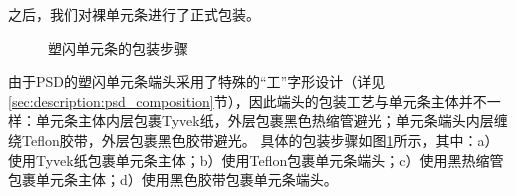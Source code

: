 之后，我们对裸单元条进行了正式包装。
\begin{figure}[htb]
\centering
{}
\caption{塑闪单元条的包装步骤}
\label{fig:construction:bar_wrapping}
\end{figure}
由于PSD的塑闪单元条端头采用了特殊的“工”字形设计（详见\ref{sec:description:psd_composition}节），因此端头的包装工艺与单元条主体并不一样：单元条主体内层包裹Tyvek纸，外层包裹黑色热缩管避光；单元条端头内层缠绕Teflon胶带，外层包裹黑色胶带避光。
具体的包装步骤如图\ref{fig:construction:bar_wrapping}所示，其中：a）使用Tyvek纸包裹单元条主体；b）使用Teflon包裹单元条端头；c）使用黑热缩管包裹单元条主体；d）使用黑色胶带包裹单元条端头。

